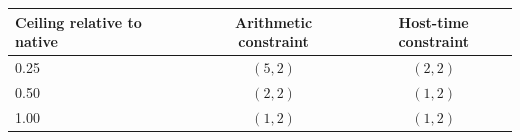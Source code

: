 \begin{tabular}{@{}lcc@{}}
\toprule
Ceiling relative to native & Arithmetic constraint & Host-time constraint\\
\midrule
0.25 & $(5,2)$ & $(2,2)$\\
0.50 & $(2,2)$ & $(1,2)$\\
1.00 & $(1,2)$ & $(1,2)$\\
\bottomrule
\end{tabular}
